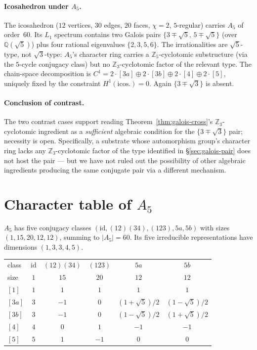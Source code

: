 \documentclass[12pt,a4paper]{article}
\theoremstyle{definition}
\theoremstyle{remark}
\newcommand{\bZ}{\mathbb{Z}}
\newcommand{\bQ}{\mathbb{Q}}                %
\providecommand{\id}{\mathrm{id}}
\begin{document}
\paragraph{Icosahedron under $A_5$.}
The icosahedron ($12$ vertices, $30$ edges, $20$ faces, $\chi = 2$,
$5$-regular) carries $A_5$ of order~$60$. Its $L_1$ spectrum contains
two Galois pairs $\{3 \mp \sqrt 5,\, 5 \mp \sqrt 5\}$ (over $\bQ(\sqrt 5)$)
plus four rational eigenvalues $\{2, 3, 5, 6\}$. The irrationalities
are $\sqrt 5$-type, not $\sqrt 3$-type: $A_5$'s character ring carries
a $\bZ_5$-cyclotomic substructure (via the $5$-cycle conjugacy class)
but no $\bZ_3$-cyclotomic factor of the relevant type. The chain-space
decomposition is $C^1 = 2\cdot[3a] \oplus 2\cdot[3b] \oplus 2\cdot[4]
\oplus 2\cdot[5]$, uniquely fixed by the constraint $H^1(\mathrm{icos.})
= 0$. Again $\{3 \mp \sqrt 3\}$ is absent.

\paragraph{Conclusion of contrast.}
The two contrast cases support reading Theorem~\ref{thm:galois-cross}'s
$\bZ_3$-cyclotomic ingredient as a \emph{sufficient} algebraic condition
for the $\{3 \mp \sqrt 3\}$ pair; necessity is open. Specifically, a
substrate whose automorphism group's character ring lacks any
$\bZ_3$-cyclotomic factor of the type identified in \S\ref{sec:galois-pair}
does not host the pair --- but we have not ruled out the possibility
of other algebraic ingredients producing the same conjugate pair via a
different mechanism.

\section{Character table of $A_5$}\label{app:tables-A5}

$A_5$ has five conjugacy classes $(\id, (12)(34), (123), 5a, 5b)$ with sizes
$(1, 15, 20, 12, 12)$, summing to $|A_5| = 60$. Its five irreducible
representations have dimensions $(1, 3, 3, 4, 5)$.

\smallskip
\begin{center}\small
\begin{tabular}{lccccc}
\toprule
class & $\id$ & $(12)(34)$ & $(123)$ & $5a$ & $5b$ \\
size & $1$ & $15$ & $20$ & $12$ & $12$ \\
\midrule
$[1]$  & $1$ & $1$  & $1$  & $1$           & $1$           \\
$[3a]$ & $3$ & $-1$ & $0$  & $(1+\sqrt 5)/2$  & $(1-\sqrt 5)/2$  \\
$[3b]$ & $3$ & $-1$ & $0$  & $(1-\sqrt 5)/2$  & $(1+\sqrt 5)/2$  \\
$[4]$  & $4$ & $0$  & $1$  & $-1$          & $-1$          \\
$[5]$  & $5$ & $1$  & $-1$ & $0$           & $0$           \\
\bottomrule
\end{tabular}
\end{center}
\end{document}
